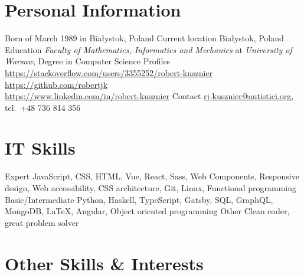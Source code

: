 

\section{Personal Information}

\begin{sectionlist}
    \sectionlistitem
        {Born}
        { of March 1989 in Bia\l{}ystok, Poland}
    \sectionlistitem
        {Current location}
        {Bia\l{}ystok, Poland}
    \sectionlistitem
        {Education}
        {
            \emph{Faculty of Mathematics, Informatics and Mechanics} at
            \emph{University of Warsaw}, Degree in Computer
            Science
        }
    \sectionlistitem
        {Profiles}
        {
            \url{https://stackoverflow.com/users/3355252/robert-kusznier} \\
            \url{https://github.com/robertjk} \\
            \url{https://www.linkedin.com/in/robert-kusznier}
        }
    \sectionlistitem
        {Contact}
        {
            \href{mailto:rj-kusznier@autistici.org}{rj-kusznier@autistici.org},
            tel.~+48 736 814 356
        }
\end{sectionlist}


\section{IT Skills}

\begin{sectionlist}
    \sectionlistitem
        {Expert}
        {
            JavaScript, CSS, HTML, Vue, React, Sass, Web Components, Responsive
            design, Web accessibility, CSS architecture, Git, Linux, Functional
            programming
        }
    \sectionlistitem
        {Basic/Intermediate}
        {
            Python, Haskell, TypeScript, Gatsby, SQL, GraphQL, MongoDB, \LaTeX,
            Angular, Object oriented programming
        }
    \sectionlistitem
        {Other}
        {Clean coder, great problem solver}
\end{sectionlist}


\section{Other Skills \& Interests}


